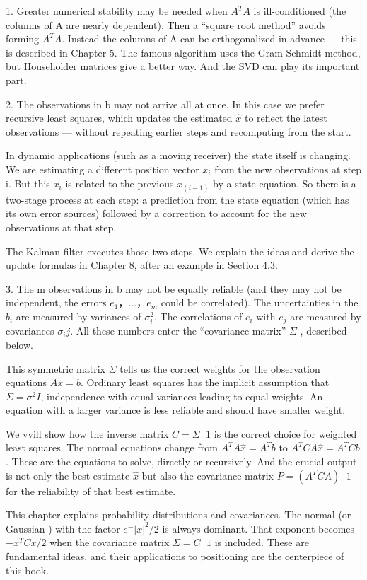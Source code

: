 1. Greater numerical stability may be needed when $A^TA$ is ill-conditioned (the columns
of A are nearly dependent). Then a “square root method” avoids forming $A^TA$.
Instead the columns of A can be orthogonalized in advance — this is described in
Chapter 5. The famous algorithm uses the Gram-Schmidt method, but Householder
matrices give a better way. And the SVD can play its important part.

2. The observations in b may not arrive all at once. In this case we prefer recursive least
squares, which updates the estimated $\hat{x}$ to reflect the latest observations — without
repeating earlier steps and recomputing from the start.

In dynamic applications (such as a moving receiver) the state itself is changing. We
are estimating a different position vector $x_i$ from the new observations at step i. But
this $x_i$ is related to the previous $x_(i-1)$ by a state equation. So there is a two-stage
process at each step: a prediction from the state equation (which has its own error
sources) followed by a correction to account for the new observations at that step.

The Kalman filter executes those two steps. We explain the ideas and derive the
update formulas in Chapter 8, after an example in Section 4.3.

3. The m observations in b may not be equally reliable (and they may not be independent, the errors $e_1，...，e_m$ could be correlated). The uncertainties in the $b_i$ are measured by variances of $\sigma^2_i$. The correlations of $e_i$ with $e_j$ are measured by covariances $\sigma_ij$. All these numbers enter the “covariance matrix” $\Sigma$ , described below. 

This symmetric matrix $\Sigma$ tells us the correct weights for the observation equations
$Ax=b$. Ordinary least squares has the implicit assumption that $\Sigma=\sigma^2I$, independence with equal variances leading to equal weights. An equation with a larger
variance is less reliable and should have smaller weight.  

We vvill show how the inverse matrix $C=\Sigma^-1$ is the correct choice for weighted
least squares. The normal equations change from $A^TA\hat{x}=A^Tb$ to $A^TCA\hat{x}=A^TCb$. These are the equations to solve, directly or recursively. And the crucial output is not only the best estimate $\hat{x}$ but also the covariance matrix $P=(A^TCA)^-1$
for the reliability of that best estimate.

This chapter explains probability distributions and covariances. The normal (or Gaussian ) with the factor $e^-|x|^2 /2$ is always dominant. That exponent becomes$-x^TCx/2$ when the covariance matrix $\Sigma=C^-1$ is included. These are fundamental ideas, and their applications to positioning are the centerpiece of this book.


